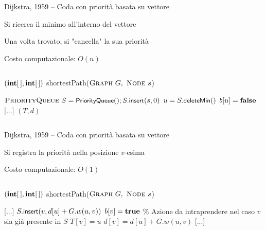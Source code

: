 \begin{frame}{Dijkstra, 1959 -- Coda con priorità basata su vettore}

\vspace{-9pt}
\begin{myboxtitle}
\BI
\item Si ricerca il minimo all'interno del vettore
\item Una volta trovato, si "cancella" la sua priorità
\item Costo computazionale: $O(n)$
\EI
\end{myboxtitle}
    
\vspace{-18pt}
\begin{columns}
\small
\begin{Procedure}
\caption[A]{$(\INTARRAY, \INTARRAY)$ \textsf{shortestPath}($\textsc{Graph}\ G,\ \textsc{Node}\ s$)}
$\textsc{PriorityQueue}\ S = \textsf{{\small PriorityQueue}}(); S.\textsf{{\small insert}}(s, 0)$\;
{
  \alert{$u = S.\textsf{{\small deleteMin}}()$}\;
  $b[u] = \FALSE$\;
  {
    {
      [...]
    }
  }
}
\Return $(T,d)$
\end{Procedure}
\end{columns}

\end{frame}

\begin{frame}{Dijkstra, 1959 -- Coda con priorità basata su vettore}

\vspace{-9pt}
\begin{myboxtitle}
\BI
\item Si registra la priorità nella posizione $v$-esima
\item Costo computazionale: $O(1)$
\EI
\end{myboxtitle}

\vspace{-18pt}
\begin{columns}
\small
\begin{Procedure}
\caption[A]{$(\INTARRAY, \INTARRAY)$ \textsf{shortestPath}($\textsc{Graph}\ G,\ \textsc{Node}\ s$)}
[...]\;
    {
      {
        \alert{$S.\textsf{{\small insert}}(v, d[u]+G.w(u,v))$}\;
        $b[v] = \TRUE$\;
      }
      {
        \% Azione da intraprendere nel caso $v$ sia già presente in $S$
      }
      $T[v] = u$\;
      $d[v] = d[u] + G.w(u,v)$\;
    }
[...]\;
\end{Procedure}
\end{columns}

\end{frame}

